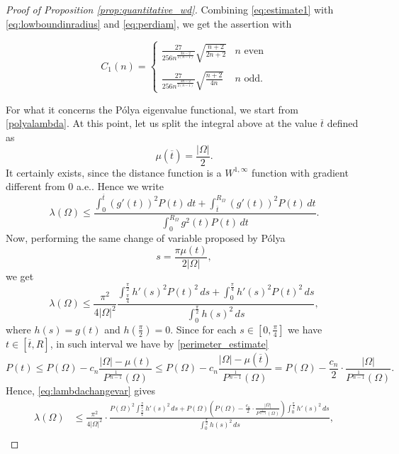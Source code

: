\documentclass[oneside,a4paper,11pt,notitlepage]{article}
\newcommand{\abs}[1]{{\left|#1\right|}}
\theoremstyle{definition}
\theoremstyle{plain}
\theoremstyle{definition}
\begin{document}
\begin{proof}[Proof of Proposition \ref{prop:quantitative_wd}]
\noindent Combining \eqref{eq:estimate1} with \eqref{eq:lowboundinradius} and \eqref{eq:perdiam}, we get the assertion with

\begin{equation*}
    \displaystyle C_1(n)=\begin{cases}
     \displaystyle{\frac{27}{256n^{\frac{3n-2}{2(n-1)}}}\sqrt{\frac{n+2}{2n+2}}} & n \,\, \text{even}\\ \\
      \displaystyle{\frac{27}{256n^{\frac{3n-2}{2(n-1)}}}\sqrt{\frac{n+2}{4n}}} & n \,\, \text{odd}.
    \end{cases}
\end{equation*}
\hspace{5mm}

For what it concerns the P\'olya eigenvalue functional, we start from \eqref{polyalambda}.
At this point, let us split the integral above at the value $\overline{t}$ defined as
$$
\mu(\overline{t})= \frac{\abs{\Omega}}{2}.
$$
It certainly exists, since the distance function is a $W^{1,\infty}$ function with gradient different from 0 a.e.. Hence we write
\begin{equation*}
    \lambda(\Omega) \leq \dfrac{\displaystyle{\int_0^{\overline{t}} (g'(t))^2 P(t) \, dt+\int_{\overline{t}}^{R_\Omega} (g'(t))^2 P(t) \, dt}}{\displaystyle{\int_0^{R_\Omega} g^2(t) P(t) \, dt}}.
\end{equation*}
Now, performing the same change of variable proposed by P\'olya
\begin{equation*}
    s= \frac{\pi\mu(t)}{2|\Omega|},
\end{equation*}
we get
\begin{equation}\label{eq:lambdachangevar}
    \lambda(\Omega) \le \frac{\pi^2}{4\abs{\Omega}^2}\frac{\displaystyle \int_{\frac{\pi}{4}}^{\frac{\pi}{2}}h'(s)^2P(t)^2\,ds +\int_0^{\frac{\pi}{4}}h'(s)^2P(t)^2\,ds}{\displaystyle\int_0^{\frac{\pi}{2}}h(s)^2\,ds},
\end{equation}
where $h(s)=g(t)$ and $h(\frac{\pi}{2})=0$. Since for each $s \in \left[0, \frac{\pi}{4}\right]$ we have $t\in [\overline{t}, R]$, in such interval we have by \eqref{perimeter_estimate}
$$
 P(t)\leq P(\Omega) - c_n \frac{\abs{\Omega} - \mu(t)}{P^{\frac{1}{n-1}}(\Omega)} \leq P(\Omega) - c_n \frac{\abs{\Omega} - \mu(\overline{t})}{P^{\frac{1}{n-1}}(\Omega)}=P(\Omega) - \frac{c_n}{2}\cdot\frac{\abs{\Omega}}{P^{\frac{1}{n-1}}(\Omega)}.
$$
Hence, \eqref{eq:lambdachangevar} gives
\begin{align*}\label{eq:bho}
    \lambda(\Omega) &\le \frac{\pi^2}{4\abs{\Omega}^2}\cdot\frac{\displaystyle P(\Omega)^2\int_{\frac{\pi}{4}}^{\frac{\pi}{2}}h'(s)^2\,ds +P(\Omega) \left(P(\Omega) - \frac{c_n}{2}\cdot\frac{\abs{\Omega}}{P^{\frac{1}{n-1}}(\Omega)}\right)\int_0^{\frac{\pi}{4}}h'(s)^2\,ds}{\displaystyle\int_0^{\frac{\pi}{2}}h(s)^2\,ds},\\

\end{align*}
\end{proof}
\end{document}
